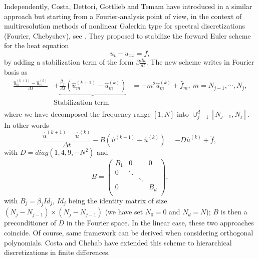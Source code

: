 \documentclass[11pt]{article}
\newcommand{\Frac}[2] {\frac{\textstyle #1} {\textstyle #2}}
\begin{document}
{Independently, Costa, Dettori, Gottlieb and Temam have introduced in
\cite{BCostaPHD,CDGT} a similar approach but starting from a
Fourier-analysis point of view, in the context of multiresolution methods of
nonlinear Galerkin type for spectral discretizations (Fourier,
Chebyshev), see \cite{TemamIDS}. They proposed to stabilize the forward Euler scheme for
the heat equation
$$
u_t -u_{xx}=f,
$$
by adding a stabilization term of the form $\beta\Frac{du}{dt}$. The
new scheme writes in Fourier basis as
\begin{equation}
\begin{array}{lcl}
\Frac{{\hat u}^{(k+1)}_m-{\hat u}^{(k)}_m}{\Delta t}& +\underbrace{\Frac{\beta_j}{\Delta t}({\hat u}^{(k+1)}_m-{\hat u}^{(k)}_m)}
&=-m^2{\hat u}^{(k)}_m + {\hat f}_m, \ m=N_{j-1}, \cdots, N_{j},\\
 & \mbox{Stabilization term}& \\
 \end{array}
\end{equation}
where we have decomposed the frequency range $[1,N]$ into $\displaystyle{\cup_{j=1}^{d}[N_{j-1},N_{j}]}$. In other words
$$
\Frac{{\hat u}^{(k+1)}-{\hat u}^{(k)}}{\Delta t} -B({\hat u}^{(k+1)}-{\hat u}^{(k)})
=-D{\hat u}^{(k)} + {\hat f}, \
$$
with $D=diag(1,4,9, \cdots N^2)$ and 
$$
B=
\left(
\begin{array}{llll}
B_1 & 0 & & 0\\
0 & \ddots &  & \\
 & & \ddots &   \\
 0 & &  & B_d\\
\end{array}
\right),
$$
with $B_j=\beta_j Id_j$, $Id_j$ being the identity matrix of size $(N_{j}-N_{j-1}) \times (N_{j}- N_{j-1})$ (we have set $N_0=0$ and $N_d=N$);
$B$ is then a preconditioner of $D$ in the Fourier space. In the linear case, these two approaches coincide. Of course, same framework can be derived when considering orthogonal polynomials.
Costa and Chehab \cite{ChehabCosta1,ChehabCosta2} have
extended this scheme to hierarchical discretizations in finite
differences.\\


}
\end{document}
